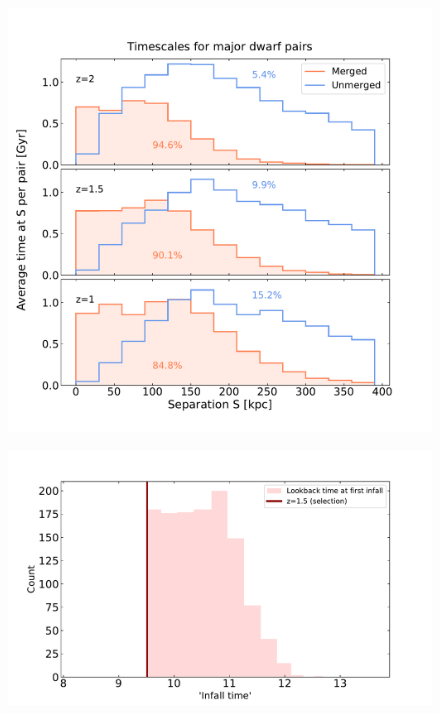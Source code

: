 \documentclass[twocolumn]{aastex631}
\begin{document}
\begin{figure}[htb]
    \centering
    \includegraphics[width=\columnwidth]{plots/4_timescales/timevssep_z.pdf}
    \caption{}
\end{figure}

\begin{figure}[htb]
    \centering
    \includegraphics[width=\columnwidth]{plots/5_define-beginning/countvsinfalltime.pdf}
    \caption{}
\end{figure}
\end{document}
